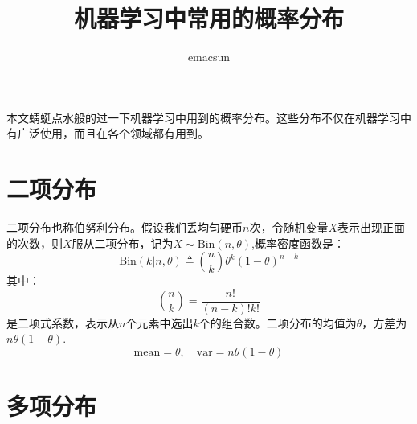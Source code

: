 \documentclass[10pt,a4paper,UTF8]{article}
\author{emacsun}
\date{}
\title{机器学习中常用的概率分布}
\begin{document}
\maketitle
\tableofcontents
{}
本文蜻蜓点水般的过一下机器学习中用到的概率分布。这些分布不仅在机器学习中有广泛使用，而且在各个领域都有用到。

\section{二项分布}
\label{sec:org9f54fe6}


二项分布也称伯努利分布。假设我们丢均匀硬币\(n\)次，令随机变量\(X\)表示出现正面的次数，则\(X\)服从二项分布，记为\(X\sim \mathrm{Bin}(n,\theta)\),概率密度函数是：
\begin{equation}
\label{eq:1}
\mathrm{Bin}(k|n,\theta) \triangleq \binom{n}{k}\theta^{k}(1-\theta)^{n-k}
\end{equation}
其中：
\begin{equation}
\label{eq:2}
\binom{n}{k} = \frac{n!}{(n-k)!k!}
\end{equation}
是二项式系数，表示从\(n\)个元素中选出\(k\)个的组合数。二项分布的均值为\(\theta\)，方差为\(n\theta (1-\theta)\).
\begin{equation}
\label{eq:3}
\mathrm{mean} = \theta,\quad \mathrm{var} = n\theta(1-\theta)
\end{equation}
\section{多项分布}
\label{sec:org7244a60}
\end{document}
